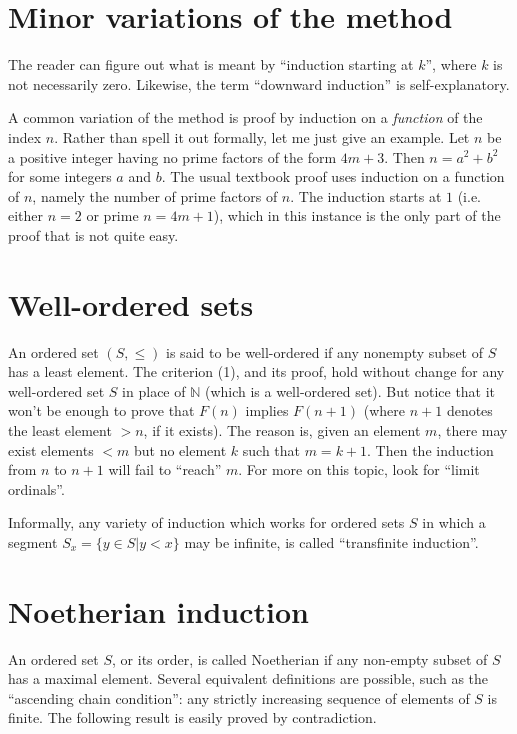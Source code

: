 \documentclass[12pt]{article}
\begin{document}
\section{Minor variations of the method}

The reader can figure out what is meant by ``induction starting at $k$'',
where $k$ is not necessarily zero.
Likewise, the term ``downward induction'' is self-explanatory.

A common variation of the method is proof by induction on a
\emph{function} of the index $n$.
Rather than spell it out formally, let me just give an example.
Let $n$ be a positive integer having no prime factors of the form $4m+3$.
Then $n=a^2+b^2$ for some integers $a$ and $b$.
The usual textbook proof uses induction on a function of
$n$, namely the number of prime factors of $n$.
The induction starts at $1$ (i.e. either $n=2$
or prime $n=4m+1$), which in this
instance is the only part of the proof that is not quite easy.

\section{Well-ordered sets}
An ordered set $(S,\le)$ is said to be well-ordered if any nonempty subset
of $S$ has a least element.
The criterion (1), and its proof, hold without change for any well-ordered
set $S$ in place of $\mathbb{N}$ (which is a well-ordered set).
But notice that it won't be enough to prove that $F(n)$ implies $F(n+1)$
(where $n+1$ denotes the least element $>n$, if it exists).
The reason is, given an element $m$, there may exist
elements $<m$ but no element $k$ such that $m=k+1$.
Then the induction from $n$ to $n+1$ will fail to ``reach'' $m$.
For more on this topic, look for ``limit ordinals''.

Informally, any variety of induction which
works for ordered sets $S$ in which a segment
$S_x=\{y\in S | y<x\}$ may be infinite, is called ``transfinite induction''.

\section{Noetherian induction}
An ordered set $S$, or its order, is called Noetherian if any non-empty
subset of $S$ has a maximal element.
Several equivalent definitions are
possible, such as the ``ascending chain condition'':
any strictly increasing sequence of elements of $S$ is finite.
The following result is easily proved by contradiction.
\end{document}
